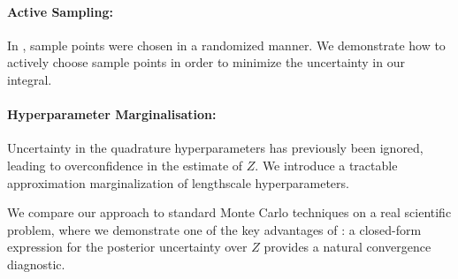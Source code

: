 \documentclass{article}
\begin{document}
\paragraph*{Active Sampling:} In \citep{BZMonteCarlo}, sample points were chosen in a randomized manner.  We demonstrate how to actively choose sample points in order to minimize the uncertainty in our integral.

\paragraph*{Hyperparameter Marginalisation:} Uncertainty in the quadrature hyperparameters has previously been ignored, leading to overconfidence in the estimate of $Z$.  We introduce a tractable approximation marginalization of lengthscale hyperparameters.



We compare our  approach to standard Monte Carlo techniques on a real scientific problem, where we demonstrate one of the key advantages of : a closed-form expression for the posterior uncertainty over $Z$ provides a natural convergence diagnostic.




\end{document}
